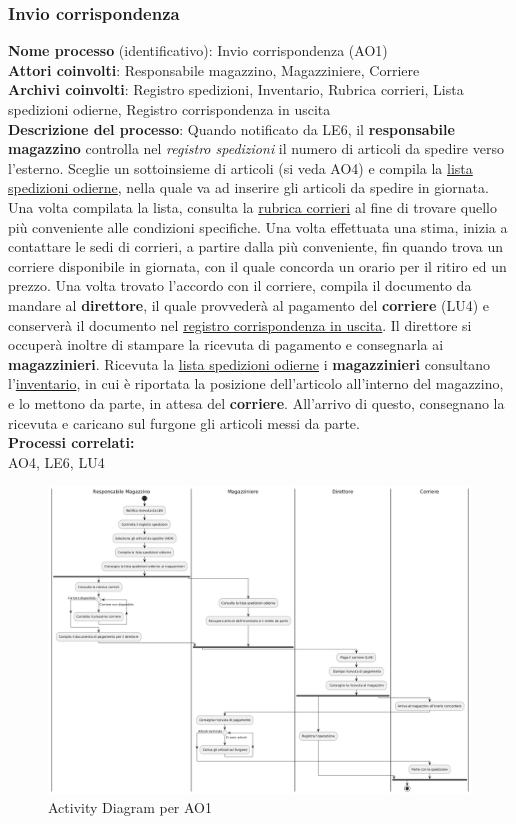 \documentclass[a4paper,12pt]{article}
\begin{document}
\newpage
\subsubsection{Invio corrispondenza}
\textbf{Nome processo} (identificativo): Invio corrispondenza (AO1) \\
\textbf{Attori coinvolti}: Responsabile magazzino, Magazziniere, Corriere \\
\textbf{Archivi coinvolti}: Registro spedizioni, Inventario, Rubrica corrieri, Lista spedizioni odierne, Registro corrispondenza in uscita \\
\textbf{Descrizione del processo}: Quando notificato da LE6, il \textbf{responsabile magazzino} controlla nel \textit{registro spedizioni} il numero di articoli
da spedire verso l'esterno. Sceglie un sottoinsieme di articoli (si veda AO4) e compila la \underline{lista spedizioni odierne}, 
nella quale va ad inserire gli articoli da spedire in giornata. Una volta compilata la lista, consulta la \underline{rubrica corrieri} al fine
di trovare quello più conveniente alle condizioni specifiche. Una volta effettuata una stima, inizia a contattare le sedi di corrieri, a partire dalla più 
conveniente, fin quando trova un corriere disponibile in giornata, con il quale concorda un orario per il ritiro ed un prezzo.
Una volta trovato l'accordo con il corriere, compila il documento da mandare al \textbf{direttore}, il quale provvederà al pagamento del \textbf{corriere} (LU4)
e conserverà il documento nel \underline{registro corrispondenza in uscita}. Il direttore si occuperà inoltre di stampare la ricevuta di pagamento e 
consegnarla ai \textbf{magazzinieri}.
Ricevuta la \underline{lista spedizioni odierne} i \textbf{magazzinieri} consultano l'\underline{inventario}, in cui è riportata la posizione dell'articolo
all'interno del magazzino, e lo mettono da parte, in attesa del \textbf{corriere}. All'arrivo di questo, consegnano la ricevuta e caricano sul furgone gli articoli messi da parte. \\
\textbf{Processi correlati:}\\AO4, LE6, LU4\\
\begin{figure}[H]
  \centering
  \includegraphics[width=0.8\linewidth]{assets/activitydiagram_AO1.png}
  \caption{Activity Diagram per AO1}
\end{figure}
\end{document}
